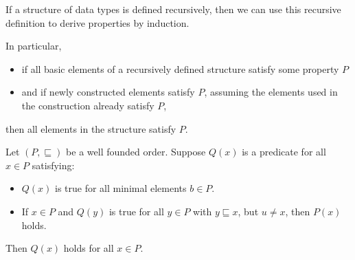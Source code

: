 \begin{principle}
    If a structure of data types is defined recursively, then we can use this
    recursive definition to derive properties by induction.

    In particular,
    \begin{itemize}
        \item if all basic elements of a recursively defined structure satisfy some
        property $P$
        \item and if newly constructed elements satisfy $P$, assuming the elements
        used in the construction already satisfy $P$,
    \end{itemize}
    then all elements in the structure satisfy $P$.
\end{principle}

\begin{principle}
    Let $ (P, \sqsubseteq) $ be a well founded order. Suppose $ Q(x) $ is a
    predicate for all $ x \in P $ satisfying:
    \begin{itemize}
        \item $ Q(x) $ is true for all minimal elements $b \in P$.
        \item If $ x \in P $ and $ Q(y) $ is true for all $ y \in P $ with
        $ y \sqsubseteq x $, but $ u \ne x $, then $P(x)$ holds.
    \end{itemize}
    Then $ Q(x) $ holds for all $ x \in P $.
\end{principle}